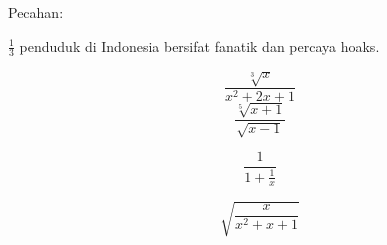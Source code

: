 \documentclass[11pt]{article}
\begin{document}
Pecahan:

$\displaystyle{\frac{1}{3}}$ penduduk di Indonesia bersifat fanatik dan percaya hoaks.

$$\frac{\sqrt[3]{x}}{x^2+2x+1}$$
$$\frac{\sqrt[5]{x+1}}{\sqrt{x-1}}$$

$$\frac{1}{1+\frac{1}{x}}$$

$$\sqrt{\frac{x}{x^2+x+1}}$$
\end{document}
